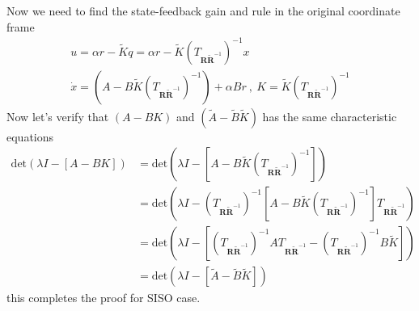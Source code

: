 \documentclass[twoside]{article}
\begin{document}
%
Now we need to find the state-feedback gain and rule in the original coordinate frame
\begin{align*}
 u = \alpha r - \tilde{K} q = \alpha r - \tilde{K} \left( T_{\mathbf{R} \tilde{\mathbf{R}}^{-1}} \right)^{-1} x     
 \\
 \dot{x} = \left( A - B \tilde{K} \left( T_{\mathbf{R} \tilde{\mathbf{R}}^{-1}} \right)^{-1} \right) + \alpha B r \ , \ K = \tilde{K} \left( T_{\mathbf{R} \tilde{\mathbf{R}}^{-1}} \right)^{-1}
\end{align*} 
%
Now let's verify that $(A - B K)$ and $( \tilde{A} - \tilde{B} \tilde{K} )$ has the same characteristic equations
%
\begin{align*}
 \mathrm{det}( \lambda I - \left[ A - B K \right] ) &=
 \mathrm{det}\left( \lambda I - \left[ A - B \tilde{K} \left( T_{\mathbf{R} \tilde{\mathbf{R}}^{-1}} \right)^{-1} \right] \right) 
 \\
 &= \mathrm{det}\left( \lambda I - \left( T_{\mathbf{R} \tilde{\mathbf{R}}^{-1}} \right)^{-1} 
 \left[ A - B \tilde{K} \left( T_{\mathbf{R} \tilde{\mathbf{R}}^{-1}} \right)^{-1} \right] 
T_{\mathbf{R} \tilde{\mathbf{R}}^{-1}} 
 \right) 
 \\
 &= \mathrm{det}\left( \lambda I -
 \left[ \left( T_{\mathbf{R} \tilde{\mathbf{R}}^{-1}} \right)^{-1}  A T_{\mathbf{R} \tilde{\mathbf{R}}^{-1}} - \left( T_{\mathbf{R} \tilde{\mathbf{R}}^{-1}} \right)^{-1}  B \tilde{K}  \right] 
 \right) 
 \\
 &= \mathrm{det}\left( \lambda I - \left[ \tilde{A} - \tilde{B} \tilde{K} \right] \right)
\end{align*} 
%
this completes the proof for SISO case.

\end{document}
